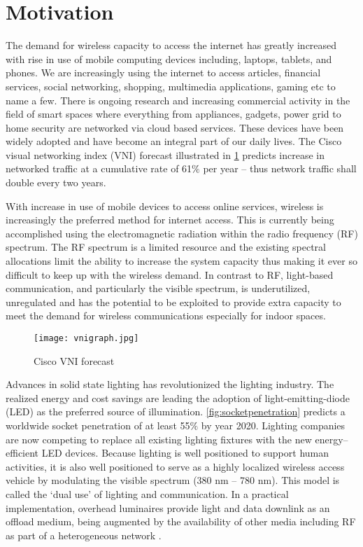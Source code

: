 \section{Motivation}
\label{sec:motivation}
\graphicspath{{_Intro/Figures/}}

The demand for wireless capacity to access the internet has greatly increased with rise in use of mobile computing devices including, laptops, tablets, and phones. We are increasingly using the internet to access articles, financial services, social networking, shopping, multimedia applications, gaming etc to name a few. There is ongoing research and increasing commercial activity in the field of smart spaces where everything from appliances, gadgets, power grid to home security are networked via cloud based services. These devices have been widely adopted and have become an integral part of our daily lives. The Cisco visual networking index (VNI) forecast \cite{cis14a} illustrated in \figurename{ \ref{fig:vnigraph}} predicts increase in networked traffic at a cumulative rate of 61$\%$ per year -- thus network traffic shall double every two years. 

With increase in use of mobile devices to access online services, wireless is increasingly the preferred method for internet access. This is currently being accomplished using the electromagnetic radiation within the radio frequency (RF) spectrum. The RF spectrum is a limited resource and the existing spectral allocations limit the ability to increase the system capacity thus making it ever so difficult to keep up with the wireless demand. In contrast to RF, light-based communication, and particularly the visible spectrum, is underutilized, unregulated and has the potential to be exploited to provide extra capacity to meet the demand for wireless communications especially for indoor spaces. 

\begin{figure}[!t]
	\centering
		\texttt{[image: vnigraph.jpg]}
	\caption[Cisco VNI forecast]{Cisco VNI forecast \cite{cis14a}}
	\label{fig:vnigraph}
\end{figure}

Advances in solid state lighting has revolutionized the lighting industry. The realized energy and cost savings are leading the adoption of light-emitting-diode (LED) as the preferred source of illumination. \figurename{ \ref{fig:socketpenetration}} \cite{bar11a} predicts a worldwide socket penetration of at least 55$\%$ by year 2020. Lighting companies are now competing to replace all existing lighting fixtures with the new energy--efficient LED devices. Because lighting is well positioned to support human activities, it is also well positioned to serve as a highly localized wireless access vehicle by modulating the visible spectrum (380 nm -- 780 nm). This model is called the `dual use' of lighting and communication. In a practical implementation, overhead luminaires provide light and data downlink as an offload medium, being augmented by the availability of other media including RF as part of a heterogeneous network \cite{gan13a,rah15a}. 

